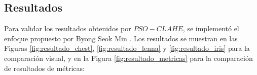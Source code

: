 \documentclass[a0,landscape,spanish]{a0poster}
\begin{document}
\begin{multicols}{3}




\color{Black} %
\section*{Resultados}

Para validar los resultados obtenidos por $PSO-CLAHE$, se implementó el enfoque propuesto por Byong Seok Min \cite{byong2013}. Los resultados se muestran en las Figuras \ref{fig:resultado_chest}, \ref{fig:resultado_lenna} y \ref{fig:resultado_iris} para la comparación visual, y en la Figura \ref{fig:resultado_metricas} para la comparación de resultados de métricas:


\end{multicols}
\end{document}
